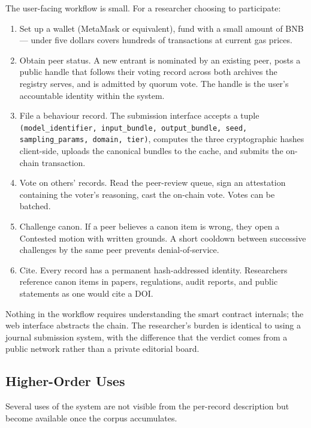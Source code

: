 \documentclass[11pt,a4paper]{article}
\begin{document}
The user-facing workflow is small. For a researcher choosing to
participate:

\begin{enumerate}[leftmargin=1.5em]
  \item Set up a wallet (MetaMask or equivalent), fund with a
        small amount of BNB --- under five dollars covers
        hundreds of transactions at current gas prices.
  \item Obtain peer status. A new entrant is nominated by an
        existing peer, posts a public handle that follows their
        voting record across both archives the registry serves,
        and is admitted by quorum vote. The handle is the user's
        accountable identity within the system.
  \item File a behaviour record. The submission interface
        accepts a tuple
        \texttt{(model\_identifier, input\_bundle, output\_bundle,
        seed, sampling\_params, domain, tier)}, computes the
        three cryptographic hashes client-side, uploads the
        canonical bundles to the cache, and submits the
        on-chain transaction.
  \item Vote on others' records. Read the peer-review queue, sign
        an attestation containing the voter's reasoning, cast
        the on-chain vote. Votes can be batched.
  \item Challenge canon. If a peer believes a canon item is
        wrong, they open a Contested motion with written grounds.
        A short cooldown between successive challenges by the
        same peer prevents denial-of-service.
  \item Cite. Every record has a permanent hash-addressed
        identity. Researchers reference canon items in papers,
        regulations, audit reports, and public statements as one
        would cite a DOI.
\end{enumerate}

Nothing in the workflow requires understanding the smart contract
internals; the web interface abstracts the chain. The
researcher's burden is identical to using a journal submission
system, with the difference that the verdict comes from a public
network rather than a private editorial board.

\subsection{Higher-Order Uses}

Several uses of the system are not visible from the per-record
description but become available once the corpus accumulates.
\end{document}
